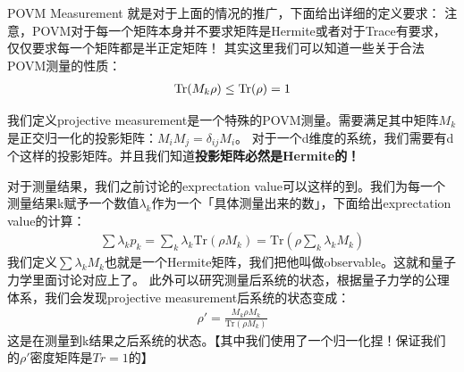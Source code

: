 POVM Measurement 就是对于上面的情况的推广，下面给出详细的定义要求：
注意，POVM对于每一个矩阵本身并不要求矩阵是Hermite或者对于Trace有要求，仅仅要求每一个矩阵都是半正定矩阵！
其实这里我们可以知道一些关于合法POVM测量的性质：
\begin{align}
  \operatorname{Tr}(M_k \rho) \leq \operatorname{Tr} (\rho)  = 1
\end{align}

\bigskip
{}

我们定义projective measurement是一个特殊的POVM测量。需要满足其中矩阵$ M_k $是正交归一化的投影矩阵：$
M_i M_j = \delta_{ij}M_i $。
对于一个d维度的系统，我们需要有d个这样的投影矩阵。并且我们知道\textbf{投影矩阵必然是Hermite的！}

对于测量结果，我们之前讨论的exprectation value可以这样的到。我们为每一个测量结果k赋予一个数值$ \lambda_k
$作为一个「具体测量出来的数」，下面给出exprectation value的计算：
\begin{align}
  \sum \lambda_k p_k = \sum_k \lambda_k \mathrm{Tr}(\rho M_k) =
  \mathrm{Tr}(\rho \sum_k \lambda_k M_k)
\end{align}
我们定义$ \sum \lambda_k M_k $也就是一个Hermite矩阵，我们把他叫做observable。这就和量子力学里面讨论对应上了。
此外可以研究测量后系统的状态，根据量子力学的公理体系，我们会发现projective measurement后系统的状态变成：
\begin{align}
  \rho' = \frac{M_k \rho M_k}{\mathrm{Tr}(\rho M_k)}
\end{align}
这是在测量到k结果之后系统的状态。【其中我们使用了一个归一化捏！保证我们的$ \rho' $密度矩阵是$ Tr = 1 $的】

